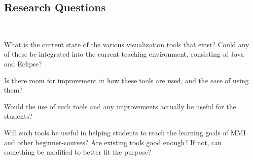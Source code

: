 \subsection{Research Questions}\label{intro-RQs}
~\\
\begin{theorem}
What is the current state of the various visualization tools that exist?
Could any of these be integrated into the current teaching environment, consisting of Java and Eclipse?
\end{theorem}
\begin{theorem}
Is there room for improvement in how these tools are used, and the ease of using them?
\end{theorem}
\begin{theorem}
Would the use of such tools and any improvements actually be useful for the students?
\end{theorem}




Will such tools be useful in helping students to reach the learning goals of MMI and other beginner-courses?
Are existing tools good enough?
If not, can something be modified to better fit the purpose?